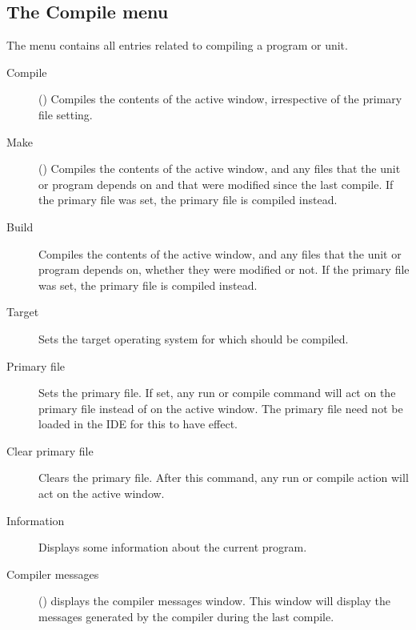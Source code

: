 \subsection{The Compile menu}
\label{se:menucompile}
The  menu contains all entries related to compiling a program or
unit.
\begin{description}
\item[Compile] () Compiles the contents of the active window,
irrespective of the primary file setting.
\item[Make] () Compiles the contents of the active window, and
any files that the unit or program depends on and that were modified since
the last compile.
If the primary file was set, the primary file is compiled instead.
\item[Build]
Compiles the contents of the active window, and any files that the unit or 
program depends on, whether they were modified or not.
If the primary file was set, the primary file is compiled instead.
\item[Target] Sets the target operating system for which should be compiled. 
\item[Primary file] Sets the primary file. If set, any run or compile command 
will act on the primary file instead of on the active window. The primary
file need not be loaded in the IDE for this to have effect.
\item[Clear primary file]
Clears the primary file. After this command, any run or compile action will
act on the active window.
\item[Information] Displays some information about the current program.
\item[Compiler messages] () displays the compiler messages
window. This window will display the messages generated by the compiler
during the last compile.
\end{description}
%
%

